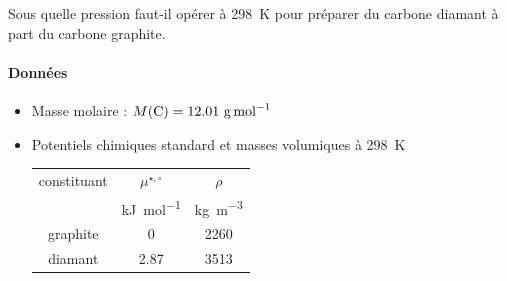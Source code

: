 \Q Sous quelle pression faut-il opérer à \SI{298}{\kelvin} pour préparer du carbone diamant à part du carbone graphite. 


\paragraph*{Données}
\begin{itemize}
\item Masse molaire : $M(\ce{C}) = 12.01 ~ \si{\gram\per\mole}$
\item Potentiels chimiques standard et masses volumiques à \SI{298}{\kelvin} 
\begin{center}
\begin{tabular}{ccc}
\toprule
constituant & $\mu^{\star, \circ}$ & $\rho$ \\
& \si{\kilo\joule\per\mole} & \si{\kilo\gram\per\meter\cubed} \\
\midrule
graphite & 0 & 2260 \\
diamant & 2.87 & 3513 \\
\bottomrule
\end{tabular}
\end{center}
\end{itemize}